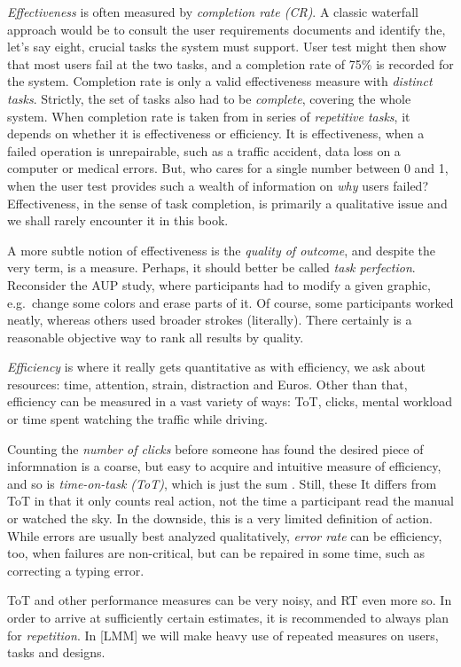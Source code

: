 \documentclass[]{svmono}
\begin{document}
\emph{Effectiveness} is often measured by \emph{completion rate (CR)}. A
classic waterfall approach would be to consult the user requirements
documents and identify the, let's say eight, crucial tasks the system
must support. User test might then show that most users fail at the two
tasks, and a completion rate of 75\% is recorded for the system.
Completion rate is only a valid effectiveness measure with
\emph{distinct tasks}. Strictly, the set of tasks also had to be
\emph{complete}, covering the whole system. When completion rate is
taken from in series of \emph{repetitive tasks}, it depends on whether
it is effectiveness or efficiency. It is effectiveness, when a failed
operation is unrepairable, such as a traffic accident, data loss on a
computer or medical errors. But, who cares for a single number between 0
and 1, when the user test provides such a wealth of information on
\emph{why} users failed? Effectiveness, in the sense of task completion,
is primarily a qualitative issue and we shall rarely encounter it in
this book.

A more subtle notion of effectiveness is the \emph{quality of outcome},
and despite the very term, is a measure. Perhaps, it should better be
called \emph{task perfection}. Reconsider the AUP study, where
participants had to modify a given graphic, e.g.~change some colors and
erase parts of it. Of course, some participants worked neatly, whereas
others used broader strokes (literally). There certainly is a reasonable
objective way to rank all results by quality.

\emph{Efficiency} is where it really gets quantitative as with
efficiency, we ask about resources: time, attention, strain, distraction
and Euros. Other than that, efficiency can be measured in a vast variety
of ways: ToT, clicks, mental workload or time spent watching the traffic
while driving.

Counting the \emph{number of clicks} before someone has found the
desired piece of informnation is a coarse, but easy to acquire and
intuitive measure of efficiency, and so is \emph{time-on-task (ToT)},
which is just the sum . Still, these It differs from ToT in that it only
counts real action, not the time a participant read the manual or
watched the sky. In the downside, this is a very limited definition of
action. While errors are usually best analyzed qualitatively,
\emph{error rate} can be efficiency, too, when failures are
non-critical, but can be repaired in some time, such as correcting a
typing error.

ToT and other performance measures can be very noisy, and RT even more
so. In order to arrive at sufficiently certain estimates, it is
recommended to always plan for \emph{repetition}. In {[}LMM{]} we will
make heavy use of repeated measures on users, tasks and designs.
\end{document}
